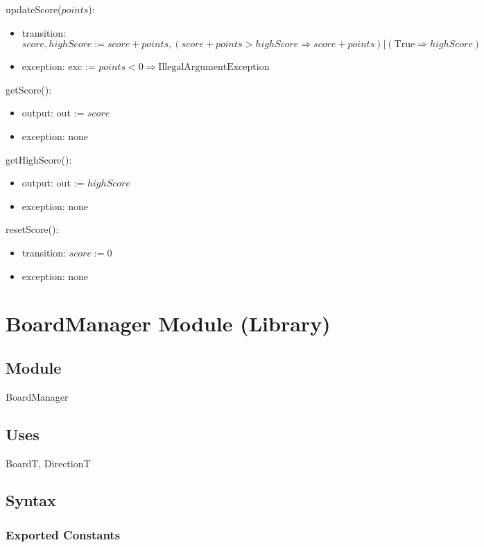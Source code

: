 \documentclass[12pt]{article}
\begin{document}
\noindent updateScore($points$):
\begin{itemize}
\item transition: $score, highScore := score + points, (score + points > highScore \Rightarrow score + points) | (\text{True} \Rightarrow highScore)$
\item exception: exc := $\mathit{points} < 0 \Rightarrow \text{IllegalArgumentException}$
\end{itemize}

\noindent getScore():
\begin{itemize}
\item output: out := $score$
\item exception: none
\end{itemize}

\noindent getHighScore():
\begin{itemize}
\item output: out := $highScore$
\item exception: none
\end{itemize}

\noindent resetScore():
\begin{itemize}
\item transition: $score := 0$
\item exception: none
\end{itemize}

\newpage

\section* {BoardManager Module (Library)}

\subsection*{Module}

BoardManager

\subsection* {Uses}

BoardT, DirectionT

\subsection* {Syntax}

\subsubsection* {Exported Constants}
\end{document}
